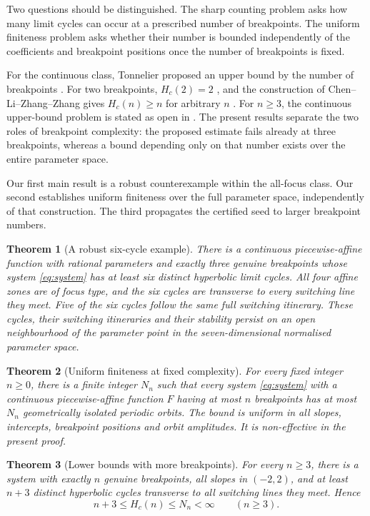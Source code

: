 \documentclass[11pt]{article}
\newtheorem{theorem}{Theorem}[section]
\theoremstyle{remark}
\begin{document}
Two questions should be distinguished.  The sharp counting problem asks
how many limit cycles can occur at a prescribed number of breakpoints.
The uniform finiteness problem asks whether their number is bounded
independently of the coefficients and breakpoint positions once the
number of breakpoints is fixed.

For the continuous class, Tonnelier proposed an upper bound by the
number of breakpoints \cite[Conjecture 2]{tonnelier}.  For two breakpoints,
\(H_c(2)=2\) \cite{twofold}, and the construction of
Chen--Li--Zhang--Zhang gives \(H_c(n)\ge n\) for arbitrary \(n\)
\cite{clzz}.  For \(n\ge3\), the continuous upper-bound problem is stated
as open in \cite{clzz}.  The present results
separate the two roles of breakpoint complexity: the proposed estimate
fails already at three breakpoints, whereas a bound depending only on
that number exists over the entire parameter space.

Our first main result is a robust counterexample within the all-focus
class.  Our second establishes uniform finiteness over the full parameter
space, independently of that construction.  The third propagates the
certified seed to larger breakpoint numbers.

\begin{theorem}[A robust six-cycle example]\label{thm:six}
There is a continuous piecewise-affine function with rational parameters
and exactly three genuine breakpoints whose system \eqref{eq:system} has
at least six distinct hyperbolic limit cycles.  All four affine zones are
of focus type, and the six cycles are transverse to every switching line
they meet.  Five of the six cycles follow the same full switching
itinerary.  These cycles, their switching itineraries and their stability
persist on an open neighbourhood of the parameter point in the
seven-dimensional normalised parameter space.
\end{theorem}

\begin{theorem}[Uniform finiteness at fixed complexity]\label{thm:finite}
For every fixed integer \(n\ge0\), there is a finite integer \(N_n\) such
that every system \eqref{eq:system} with a continuous piecewise-affine
function \(F\) having at most \(n\) breakpoints has at most \(N_n\)
geometrically isolated periodic orbits.  The bound is uniform in all slopes, intercepts,
breakpoint positions and orbit amplitudes.  It is non-effective in the
present proof.
\end{theorem}

\begin{theorem}[Lower bounds with more breakpoints]\label{thm:lower}
For every \(n\ge3\), there is a system with exactly \(n\) genuine
breakpoints, all slopes in \((-2,2)\), and at least \(n+3\) distinct
hyperbolic cycles transverse to all switching lines they meet.  Hence
\[
                 n+3\le H_c(n)\le N_n<\infty\qquad(n\ge3).
\]
\end{theorem}
\end{document}
